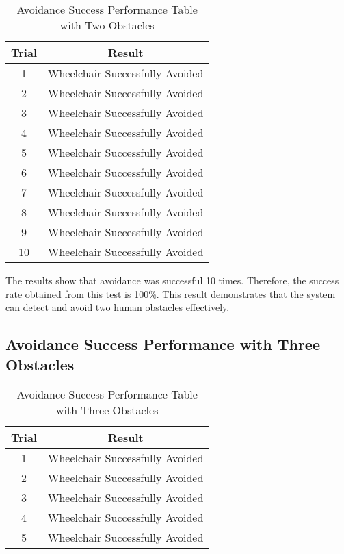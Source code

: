 \begin{table}[H]
    \centering
    \caption{Avoidance Success Performance Table with Two Obstacles}
    \label{tb:mantapkali}
    \begin{tabular}{|c|c|}
    \hline
    Trial & Result                                                  \\ \hline
    1         & \cellcolor[HTML]{9AFF99}Wheelchair Successfully Avoided \\ \hline
    2         & \cellcolor[HTML]{9AFF99}Wheelchair Successfully Avoided \\ \hline
    3         & \cellcolor[HTML]{9AFF99}Wheelchair Successfully Avoided \\ \hline
    4         & \cellcolor[HTML]{9AFF99}Wheelchair Successfully Avoided \\ \hline
    5         & \cellcolor[HTML]{9AFF99}Wheelchair Successfully Avoided \\ \hline
    6         & \cellcolor[HTML]{9AFF99}Wheelchair Successfully Avoided \\ \hline
    7         & \cellcolor[HTML]{9AFF99}Wheelchair Successfully Avoided \\ \hline
    8         & \cellcolor[HTML]{9AFF99}Wheelchair Successfully Avoided \\ \hline
    9         & \cellcolor[HTML]{9AFF99}Wheelchair Successfully Avoided \\ \hline
    10         & \cellcolor[HTML]{9AFF99}Wheelchair Successfully Avoided \\ \hline
    \end{tabular}
    \end{table}

The results show that avoidance was successful 10 times. Therefore, the success rate obtained from this test is 100\%. This result demonstrates that the system can detect and avoid two human obstacles effectively.

\subsection{Avoidance Success Performance with Three Obstacles}
\begin{table}[H]
    \centering
    \caption{Avoidance Success Performance Table with Three Obstacles}
    \label{tb:mantapkali2}
    \begin{tabular}{|c|c|}
    \hline
    Trial & Result                                                  \\ \hline
    1         & \cellcolor[HTML]{9AFF99}Wheelchair Successfully Avoided \\ \hline
    2         & \cellcolor[HTML]{9AFF99}Wheelchair Successfully Avoided \\ \hline
    3         & \cellcolor[HTML]{9AFF99}Wheelchair Successfully Avoided \\ \hline
    4         & \cellcolor[HTML]{9AFF99}Wheelchair Successfully Avoided \\ \hline
    5         & \cellcolor[HTML]{9AFF99}Wheelchair Successfully Avoided \\ \hline
    \end{tabular}
    \end{table}

